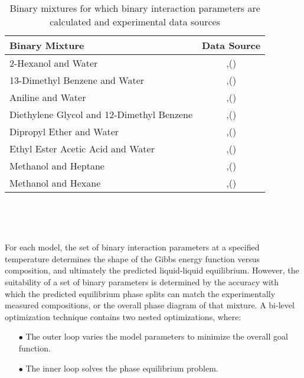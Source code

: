 \begin{table}
\begin{tabularx}{\textwidth}{Xc}
\hline
\textbf{Binary Mixture}&\textbf{Data Source}\\
\hline
\hline
2-Hexanol and Water& \citeauthor{GinningsandWebb},(\citeyear{GinningsandWebb}) \cite{GinningsandWebb} \\
13-Dimethyl Benzene and Water& \citeauthor{ChernoglazovaandSimulin},(\citeyear{ChernoglazovaandSimulin}) \cite{ChernoglazovaandSimulin}\\
Aniline and Water&\citeauthor{Campbell},(\citeyear{Campbell}) \cite{Campbell}\\
Diethylene Glycol and 12-Dimethyl Benzene&\citeauthor{LestevaTimofeevChernaya},(\citeyear{LestevaTimofeevChernaya}) \cite{LestevaTimofeevChernaya}\\
Dipropyl Ether and Water&\citeauthor{BennetPhilip},(\citeyear{BennetPhilip}) \cite{BennetPhilip}\\
Ethyl Ester Acetic Acid and Water&\citeauthor{Merriman},(\citeyear{Merriman}) \cite{Merriman}\\
Methanol and Heptane&\citeauthor{TagliaviniArich},(\citeyear{TagliaviniArich}) \cite{TagliaviniArich}\\
Methanol and Hexane&\citeauthor{RadiceKnickle},(\citeyear{RadiceKnickle}) \cite{RadiceKnickle}\\
\hline
\end{tabularx}\\
\caption{Binary mixtures for which binary interaction parameters are calculated and experimental data sources} \label{BinarySystemsandReferences}
\end{table}\

For each model, the set of binary interaction parameters at a specified temperature determines the shape of the Gibbs energy function versus composition, and ultimately the predicted liquid-liquid equilibrium. However, the suitability of a set of binary parameters is determined by the accuracy with which the predicted equilibrium phase splits can match the experimentally measured compositions, or the overall phase diagram of that mixture. A bi-level optimization technique contains two nested optimizations, where:\

\begin{itemize}
\item[$\bullet$] The outer loop varies the model parameters to minimize the overall goal function.
\item[$\bullet$] The inner loop solves the phase equilibrium problem.
\end{itemize}\

